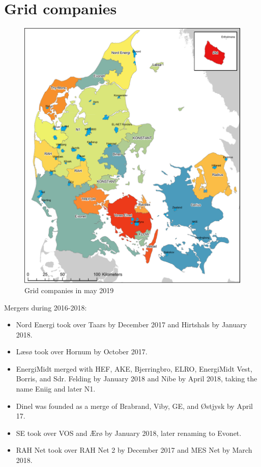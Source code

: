 \section{Grid companies}
\label{app:grids}
\begin{figure}[H]
  \centering
  \caption{Grid companies in may 2019}
  \label{fig:elnetgraenser}
    \includegraphics[width=.9 \textwidth]{03_figures/elnetgraenser_maj2019.pdf}
\end{figure}
\vspace{-1em}
\noindent
Mergers during 2016-2018:
\begin{itemize}[noitemsep]
  \item Nord Energi took over Taars by December 2017 and Hirtshals by January 2018.
  \item Læsø took over Hornum by October 2017.
  \item EnergiMidt merged with HEF, AKE, Bjerringbro, ELRO, EnergiMidt Vest, Borris, and Sdr. Felding by January 2018 and Nibe by April 2018, taking the name Eniig and later N1.
  \item Dinel was founded as a merge of Brabrand, Viby, GE, and Østjysk by April 17.
  \item SE took over VOS and Ærø by January 2018, later renaming to Evonet.
  \item RAH Net took over RAH Net 2 by December 2017 and MES Net by March 2018.
\end{itemize}
